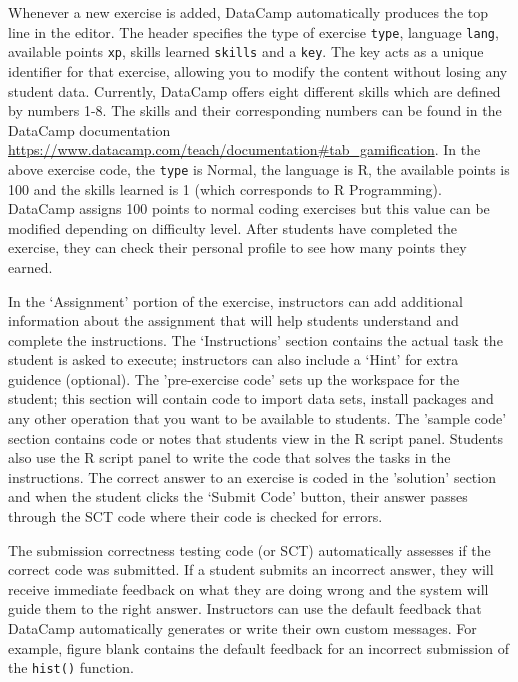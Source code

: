 \documentclass[12pt]{article}
\begin{document}
Whenever a new exercise is added, DataCamp automatically produces the top line in the editor. The header specifies the type
of exercise \texttt{type}, language \texttt{lang}, available points \texttt{xp}, skills learned \texttt{skills} and a \texttt{key}. The key acts as a unique
identifier for that exercise, allowing you to modify the content without losing any student data. Currently, DataCamp offers
eight different skills which are defined by numbers 1-8. The skills and their corresponding numbers can be found in the DataCamp
documentation \url{https://www.datacamp.com/teach/documentation#tab_gamification}. 
In the above exercise code, the \texttt{type} is Normal, the language is R, the available points is 100 and the skills learned is 1 (which 
corresponds to R Programming). DataCamp assigns 100 points to normal coding exercises but this value can be modified depending on
difficulty level. After students have completed the exercise, they can check their personal profile to see how many points they earned.


In the `Assignment' portion of the exercise, instructors can add additional information about the assignment that will help
students understand and complete the instructions. The `Instructions' section contains the actual task the student is
asked to execute; instructors can also include a `Hint' for extra guidence (optional). The 'pre-exercise code' sets up the workspace for 
the student; this section will contain code to import data sets, install packages and any other operation that you want to be available to
students. The 'sample code' section contains code or notes that students view in the R script panel. Students also use the R script panel to write
the code that solves the tasks in the instructions. The correct answer to an exercise is coded in the 'solution' section
and when the student clicks the `Submit Code' button, their answer passes through the SCT code where their code is checked for errors.


The submission correctness testing code (or SCT) automatically assesses if the correct code was submitted. If a student submits an 
incorrect answer, they will receive immediate feedback on what they are doing wrong and the system will guide them to the right answer.
Instructors can use the default feedback that DataCamp automatically generates or write their own custom messages. For example, figure blank
contains the default feedback for an incorrect submission of the \texttt{hist()} function.
\end{document}
